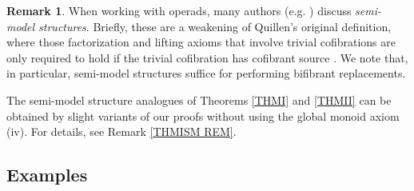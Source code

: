 \documentclass[a4paper,10pt
,draft
]{article}%
\numberwithin{equation}{section}
\numberwithin{figure}{section}
\theoremstyle{definition} %
\newtheorem{remark}[equation]{Remark}%
\newcommand{\Cat}{\mathsf{Cat}}
\newcommand{\F}{\ensuremath{\mathcal F}}
\newcommand{\V}{\ensuremath{\mathcal V}}
\newcommand{\1}{\ensuremath{\mathbbm 1}}%
\begin{document}
\begin{remark}\label{SEMI_REM}
	When working with operads, many authors (e.g. \cite{Spi,Whi17,WY18,BP_geo})
	discuss \emph{semi-model structures}.
	Briefly, these are a weakening of Quillen's original definition,
	where those factorization and lifting axioms
	that involve trivial cofibrations
	are only required to hold if the trivial cofibration 
	has cofibrant source \cite[\S 2.2]{WY18}.
	We note that, in particular, semi-model structures suffice for 
	performing %
	bifibrant replacements.
        
	The semi-model structure analogues of 
	Theorems \ref{THMI} and \ref{THMII}
	can be obtained by slight variants of our proofs
	without using the global monoid axiom (iv).
	For details, see Remark \ref{THMISM REM}.
\end{remark}



%





\subsection{Examples}\label{EXAMPLES SEC}
\end{document}
